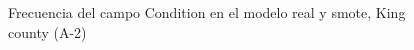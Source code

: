 \begin{figure}[H]
    \centering
    
    \caption{Frecuencia del campo Condition en el modelo real y smote, King county (A-2)}
    \label{frecuency-smote-condition}
\end{figure}
